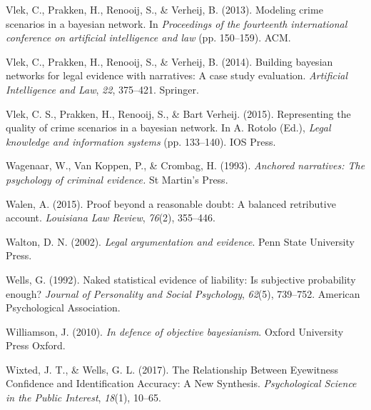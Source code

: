 \documentclass[11pt,dvipsnames,enabledeprecatedfontcommands]{scrartcl}
\begin{document}
\leavevmode\hypertarget{ref-vlek2013modeling}{}%
Vlek, C., Prakken, H., Renooij, S., \& Verheij, B. (2013). Modeling
crime scenarios in a bayesian network. In \emph{Proceedings of the
fourteenth international conference on artificial intelligence and law}
(pp. 150--159). ACM.

\leavevmode\hypertarget{ref-vlek2014building}{}%
Vlek, C., Prakken, H., Renooij, S., \& Verheij, B. (2014). Building
bayesian networks for legal evidence with narratives: A case study
evaluation. \emph{Artificial Intelligence and Law}, \emph{22}, 375--421.
Springer.

\leavevmode\hypertarget{ref-vlek2015}{}%
Vlek, C. S., Prakken, H., Renooij, S., \& Bart Verheij. (2015).
Representing the quality of crime scenarios in a bayesian network. In A.
Rotolo (Ed.), \emph{Legal knowledge and information systems} (pp.
133--140). IOS Press.

\leavevmode\hypertarget{ref-wagenaar1993anchored}{}%
Wagenaar, W., Van Koppen, P., \& Crombag, H. (1993). \emph{Anchored
narratives: The psychology of criminal evidence.} St Martin's Press.

\leavevmode\hypertarget{ref-walen2015}{}%
Walen, A. (2015). Proof beyond a reasonable doubt: A balanced
retributive account. \emph{Louisiana Law Review}, \emph{76}(2),
355--446.

\leavevmode\hypertarget{ref-Walton2002}{}%
Walton, D. N. (2002). \emph{Legal argumentation and evidence}. Penn
State University Press.

\leavevmode\hypertarget{ref-wells1992naked}{}%
Wells, G. (1992). Naked statistical evidence of liability: Is subjective
probability enough? \emph{Journal of Personality and Social Psychology},
\emph{62}(5), 739--752. American Psychological Association.

\leavevmode\hypertarget{ref-williamson2010defence}{}%
Williamson, J. (2010). \emph{In defence of objective bayesianism}.
Oxford University Press Oxford.

\leavevmode\hypertarget{ref-wixted2017RelationshipEyewitnessConfidence}{}%
Wixted, J. T., \& Wells, G. L. (2017). The Relationship Between
Eyewitness Confidence and Identification Accuracy: A New Synthesis.
\emph{Psychological Science in the Public Interest}, \emph{18}(1),
10--65.
\end{document}
